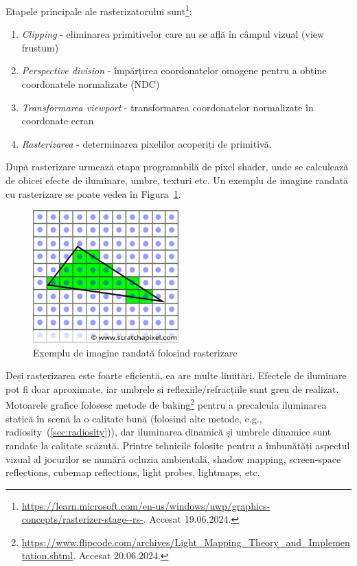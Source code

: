 \documentclass[12pt,a4paper]{report}
\numberwithin{equation}{section} %
\begin{document}
Etapele principale ale rasterizatorului sunt\footnote{\url{https://learn.microsoft.com/en-us/windows/uwp/graphics-concepts/rasterizer-stage--rs-}. Accesat 19.06.2024.}:
\begin{enumerate}
	\item \textit{Clipping} - eliminarea primitivelor care nu se află în câmpul vizual (view frustum)
	\item \textit{Perspective division} - împărțirea coordonatelor omogene pentru a obține coordonatele normalizate (NDC)
	\item \textit{Transformarea viewport} - transformarea coordonatelor normalizate în coordonate ecran
	\item \textit{Rasterizarea} - determinarea pixelilor acoperiți de primitivă.
\end{enumerate}
După rasterizare urmează etapa programabilă de pixel shader, unde se calculează de
obicei efecte de iluminare, umbre, texturi etc.
Un exemplu de imagine randată cu rasterizare se poate vedea în Figura~\ref{fig:rasterization}.

\begin{figure}[ht]
	\centering
	\includegraphics[width=0.5\textwidth]{pics/rasterization.png}
	\caption{Exemplu de imagine randată folosind rasterizare\protect\footnotemark}
	\label{fig:rasterization}
\end{figure}

Deși rasterizarea este foarte eficientă, ea are multe limitări. Efectele de iluminare
pot fi doar aproximate, iar umbrele și reflexiile/refracțiile sunt greu de realizat. Motoarele
grafice folosesc metode de baking\footnote{\url{https://www.flipcode.com/archives/Light_Mapping_Theory_and_Implementation.shtml}. Accesat 20.06.2024.} pentru a precalcula iluminarea statică în scenă
la o calitate bună (folosind alte metode, e.g., radiosity~(\ref{sec:radiosity})), dar iluminarea dinamică și umbrele dinamice sunt randate la
calitate scăzută. Printre tehnicile folosite pentru a îmbunătăți aspectul vizual
al jocurilor se numără ocluzia ambientală, shadow mapping, screen-space reflections,
cubemap reflections, light probes, lightmaps, etc.
\end{document}
